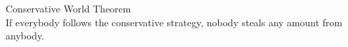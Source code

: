 \begin{theoremgr}{Conservative World Theorem} \ \\
  \label{conservativeworld}
  If everybody follows the conservative strategy, nobody steals any amount from anybody.
\end{theoremgr}
